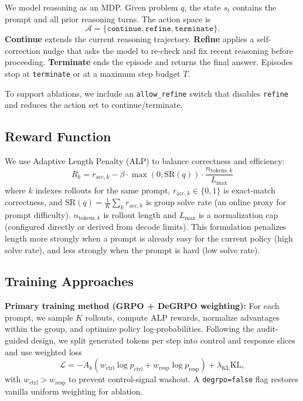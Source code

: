 \documentclass{article}
\begin{document}
We model reasoning as an MDP. Given problem $q$, the state $s_t$ contains the prompt and all prior reasoning turns. The action space is
\[
\mathcal{A}=\{\texttt{continue},\texttt{refine},\texttt{terminate}\}.
\]
\textbf{Continue} extends the current reasoning trajectory. \textbf{Refine} applies a self-correction nudge that asks the model to re-check and fix recent reasoning before proceeding. \textbf{Terminate} ends the episode and returns the final answer. Episodes stop at \texttt{terminate} or at a maximum step budget $T$.

To support ablations, we include an \texttt{allow\_refine} switch that disables \texttt{refine} and reduces the action set to continue/terminate.

\subsection{Reward Function}

We use Adaptive Length Penalty (ALP) to balance correctness and efficiency:
\begin{equation}
    R_k = r_{\text{acc},k} - \beta \cdot \max(0,\mathrm{SR}(q)) \cdot \frac{n_{\text{tokens},k}}{L_{\max}}
\end{equation}
where $k$ indexes rollouts for the same prompt, $r_{\text{acc},k}\in\{0,1\}$ is exact-match correctness, and $\mathrm{SR}(q)=\frac{1}{K}\sum_k r_{\text{acc},k}$ is group solve rate (an online proxy for prompt difficulty). $n_{\text{tokens},k}$ is rollout length and $L_{\max}$ is a normalization cap (configured directly or derived from decode limits). This formulation penalizes length more strongly when a prompt is already easy for the current policy (high solve rate), and less strongly when the prompt is hard (low solve rate).

\subsection{Training Approaches}

\textbf{Primary training method (GRPO + DeGRPO weighting):} For each prompt, we sample $K$ rollouts, compute ALP rewards, normalize advantages within the group, and optimize policy log-probabilities. Following the audit-guided design, we split generated tokens per step into control and response slices and use weighted loss
\[
\mathcal{L}=-A_k\left(w_{\text{ctrl}}\log p_{\text{ctrl}} + w_{\text{resp}}\log p_{\text{resp}}\right)+\lambda_{\text{KL}}\mathrm{KL},
\]
with $w_{\text{ctrl}}>w_{\text{resp}}$ to prevent control-signal washout. A \texttt{degrpo=false} flag restores vanilla uniform weighting for ablation.
\end{document}
